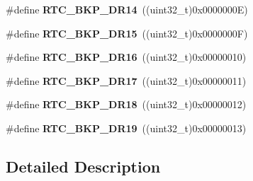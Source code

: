 \begin{DoxyCompactItemize}
\item 
\#define {\bfseries R\+T\+C\+\_\+\+B\+K\+P\+\_\+\+D\+R14}~((uint32\+\_\+t)0x0000000\+E)\hypertarget{group___r_t_c_ex___backup___registers___definitions_ga718011f7c07a8a734fd51de0161fcddb}{}\label{group___r_t_c_ex___backup___registers___definitions_ga718011f7c07a8a734fd51de0161fcddb}

\item 
\#define {\bfseries R\+T\+C\+\_\+\+B\+K\+P\+\_\+\+D\+R15}~((uint32\+\_\+t)0x0000000\+F)\hypertarget{group___r_t_c_ex___backup___registers___definitions_ga01ad7db765e52ecd13f24bb09db27789}{}\label{group___r_t_c_ex___backup___registers___definitions_ga01ad7db765e52ecd13f24bb09db27789}

\item 
\#define {\bfseries R\+T\+C\+\_\+\+B\+K\+P\+\_\+\+D\+R16}~((uint32\+\_\+t)0x00000010)\hypertarget{group___r_t_c_ex___backup___registers___definitions_ga767f5e169b56f4a2364deb705d322a7b}{}\label{group___r_t_c_ex___backup___registers___definitions_ga767f5e169b56f4a2364deb705d322a7b}

\item 
\#define {\bfseries R\+T\+C\+\_\+\+B\+K\+P\+\_\+\+D\+R17}~((uint32\+\_\+t)0x00000011)\hypertarget{group___r_t_c_ex___backup___registers___definitions_gabba03a6ab599f5f45db95244500177ff}{}\label{group___r_t_c_ex___backup___registers___definitions_gabba03a6ab599f5f45db95244500177ff}

\item 
\#define {\bfseries R\+T\+C\+\_\+\+B\+K\+P\+\_\+\+D\+R18}~((uint32\+\_\+t)0x00000012)\hypertarget{group___r_t_c_ex___backup___registers___definitions_ga9fc8a8a86892e0c517a56b2804b53006}{}\label{group___r_t_c_ex___backup___registers___definitions_ga9fc8a8a86892e0c517a56b2804b53006}

\item 
\#define {\bfseries R\+T\+C\+\_\+\+B\+K\+P\+\_\+\+D\+R19}~((uint32\+\_\+t)0x00000013)\hypertarget{group___r_t_c_ex___backup___registers___definitions_ga384af548d7386c490e6a65b2600c8c2b}{}\label{group___r_t_c_ex___backup___registers___definitions_ga384af548d7386c490e6a65b2600c8c2b}

\end{DoxyCompactItemize}


\subsection{Detailed Description}
